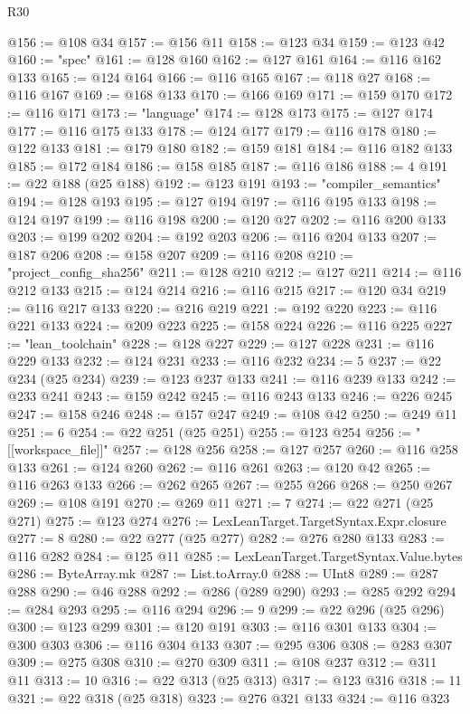 \begin{lexlean}{R30}
\begin{coremodule}
@156 := @108 @34
@157 := @156 @11
@158 := @123 @34
@159 := @123 @42
@160 := "spec"
@161 := @128 @160
@162 := @127 @161
@164 := @116 @162 @133
@165 := @124 @164
@166 := @116 @165
@167 := @118 @27
@168 := @116 @167
@169 := @168 @133
@170 := @166 @169
@171 := @159 @170
@172 := @116 @171
@173 := "language"
@174 := @128 @173
@175 := @127 @174
@177 := @116 @175 @133
@178 := @124 @177
@179 := @116 @178
@180 := @122 @133
@181 := @179 @180
@182 := @159 @181
@184 := @116 @182 @133
@185 := @172 @184
@186 := @158 @185
@187 := @116 @186
@188 := 4
@191 := @22 @188 (@25 @188)
@192 := @123 @191
@193 := "compiler_semantics"
@194 := @128 @193
@195 := @127 @194
@197 := @116 @195 @133
@198 := @124 @197
@199 := @116 @198
@200 := @120 @27
@202 := @116 @200 @133
@203 := @199 @202
@204 := @192 @203
@206 := @116 @204 @133
@207 := @187 @206
@208 := @158 @207
@209 := @116 @208
@210 := "project_config_sha256"
@211 := @128 @210
@212 := @127 @211
@214 := @116 @212 @133
@215 := @124 @214
@216 := @116 @215
@217 := @120 @34
@219 := @116 @217 @133
@220 := @216 @219
@221 := @192 @220
@223 := @116 @221 @133
@224 := @209 @223
@225 := @158 @224
@226 := @116 @225
@227 := "lean_toolchain"
@228 := @128 @227
@229 := @127 @228
@231 := @116 @229 @133
@232 := @124 @231
@233 := @116 @232
@234 := 5
@237 := @22 @234 (@25 @234)
@239 := @123 @237 @133
@241 := @116 @239 @133
@242 := @233 @241
@243 := @159 @242
@245 := @116 @243 @133
@246 := @226 @245
@247 := @158 @246
@248 := @157 @247
@249 := @108 @42
@250 := @249 @11
@251 := 6
@254 := @22 @251 (@25 @251)
@255 := @123 @254
@256 := "[[workspace_file]]"
@257 := @128 @256
@258 := @127 @257
@260 := @116 @258 @133
@261 := @124 @260
@262 := @116 @261
@263 := @120 @42
@265 := @116 @263 @133
@266 := @262 @265
@267 := @255 @266
@268 := @250 @267
@269 := @108 @191
@270 := @269 @11
@271 := 7
@274 := @22 @271 (@25 @271)
@275 := @123 @274
@276 := LexLeanTarget.TargetSyntax.Expr.closure
@277 := 8
@280 := @22 @277 (@25 @277)
@282 := @276 @280 @133
@283 := @116 @282
@284 := @125 @11
@285 := LexLeanTarget.TargetSyntax.Value.bytes
@286 := ByteArray.mk
@287 := List.toArray.{0}
@288 := UInt8
@289 := @287 @288
@290 := @46 @288
@292 := @286 (@289 @290)
@293 := @285 @292
@294 := @284 @293
@295 := @116 @294
@296 := 9
@299 := @22 @296 (@25 @296)
@300 := @123 @299
@301 := @120 @191
@303 := @116 @301 @133
@304 := @300 @303
@306 := @116 @304 @133
@307 := @295 @306
@308 := @283 @307
@309 := @275 @308
@310 := @270 @309
@311 := @108 @237
@312 := @311 @11
@313 := 10
@316 := @22 @313 (@25 @313)
@317 := @123 @316
@318 := 11
@321 := @22 @318 (@25 @318)
@323 := @276 @321 @133
@324 := @116 @323

\end{coremodule}
\end{lexlean}
